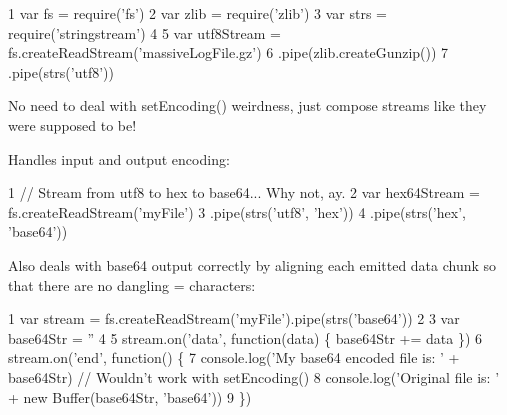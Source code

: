 
\begin{DoxyCode}
1 var fs   = require('fs')
2 var zlib = require('zlib')
3 var strs = require('stringstream')
4 
5 var utf8Stream = fs.createReadStream('massiveLogFile.gz')
6   .pipe(zlib.createGunzip())
7   .pipe(strs('utf8'))
\end{DoxyCode}


No need to deal with {\ttfamily set\+Encoding()} weirdness, just compose streams like they were supposed to be!

Handles input and output encoding\+:


\begin{DoxyCode}
1 // Stream from utf8 to hex to base64... Why not, ay.
2 var hex64Stream = fs.createReadStream('myFile')
3   .pipe(strs('utf8', 'hex'))
4   .pipe(strs('hex', 'base64'))
\end{DoxyCode}


Also deals with {\ttfamily base64} output correctly by aligning each emitted data chunk so that there are no dangling {\ttfamily =} characters\+:


\begin{DoxyCode}
1 var stream = fs.createReadStream('myFile').pipe(strs('base64'))
2 
3 var base64Str = ''
4 
5 stream.on('data', function(data) \{ base64Str += data \})
6 stream.on('end', function() \{
7   console.log('My base64 encoded file is: ' + base64Str) // Wouldn't work with setEncoding()
8   console.log('Original file is: ' + new Buffer(base64Str, 'base64'))
9 \})
\end{DoxyCode}
 